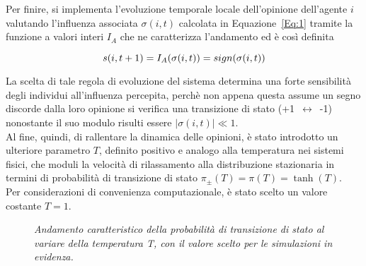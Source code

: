 \documentclass{article}
\begin{document}
Per finire, si implementa l'evoluzione temporale locale dell'opinione dell'agente $\textit{i}$ valutando l'influenza associata $\sigma(i,t)$  calcolata in Equazione~\ref{Eq:1} tramite la funzione a valori interi $I_{A}$ che ne caratterizza l'andamento ed è così definita

\begin{equation}
    s(i,t+1) = I_A(\sigma(i,t)) = sign(\sigma(i,t))
    \medskip
    \label{Eq:3}
\end{equation}

La scelta di tale regola di evoluzione del sistema determina una forte sensibilità degli individui all'influenza percepita, perchè non appena questa assume un segno discorde dalla loro opinione si verifica una transizione di stato \mbox{(+1 $\longleftrightarrow$ -1)} nonostante il suo modulo risulti essere $|\sigma(i,t)| \ll 1$.
\bigskip
\\ Al fine, quindi, di rallentare la dinamica delle opinioni, è stato introdotto un ulteriore parametro $\textit{T}$, definito positivo e analogo alla temperatura nei sistemi fisici, che moduli la velocità di rilassamento alla distribuzione stazionaria in termini di probabilità di transizione di stato $ \pi_{\pm}(T) = \pi(T) = \tanh (T)$.
\\ Per considerazioni di convenienza computazionale, è stato scelto un valore costante $T=1$.

\begin{figure}[h]
\centering
{}
\caption{\textit{Andamento caratteristico della probabilità di transizione di stato al variare della temperatura T, con il valore scelto per le simulazioni in evidenza.}}
\label{fig:4}
\end{figure}
\end{document}

